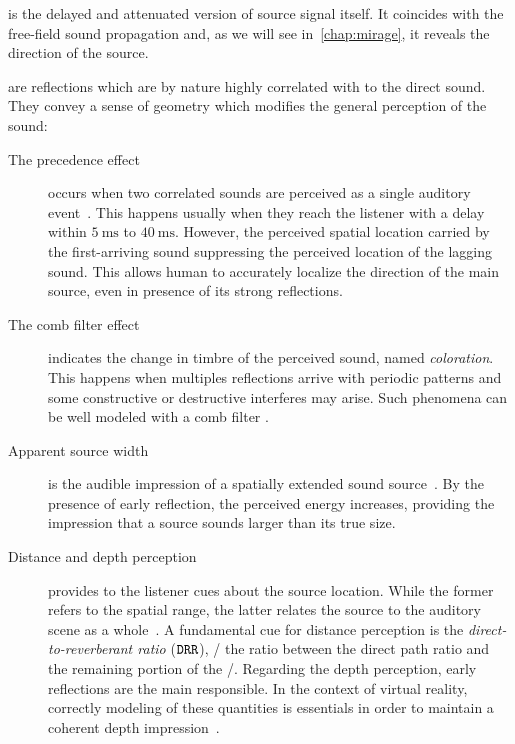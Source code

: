  is the delayed and attenuated version of source signal itself.
It coincides with the free-field sound propagation and, as we will see in~\cref{chap:mirage}, it reveals the direction of the source.

 are reflections which are by nature highly correlated with to the direct sound.
They convey a sense of geometry which modifies the general perception of the sound:
\begin{description}
    \item[The precedence effect] occurs when two correlated sounds are perceived as a single auditory event~.
    This happens usually when they reach the listener with a delay within $\SI{5}{\ms}$ to $\SI{40}{\ms}$.
    However, the perceived spatial location carried by the first-arriving sound suppressing the perceived location of the lagging sound.
    This allows human to accurately localize the direction of the main source, even in presence of its strong reflections.
    \item[The comb filter effect] indicates the change in timbre of the perceived sound, named \textit{coloration}.
    This happens when multiples reflections arrive with periodic patterns and some constructive or destructive interferes may arise.
    Such phenomena can be well modeled with a comb filter .
    \item[Apparent source width] is the audible impression of a spatially extended sound source~.
    By the presence of early reflection, the perceived energy increases, providing the impression that a source sounds larger than its true size.
    \item[Distance and depth perception] provides to the listener cues about the source location.
    While the former refers to the spatial range, the latter relates the source to the auditory scene as a whole~.
    A fundamental cue for distance perception is the \textit{direct-to-reverberant ratio} ($\mathtt{DRR}$),
    \ie/ the ratio between the direct path ratio and the remaining portion of the \RIR/.
    Regarding the depth perception, early reflections are the main responsible.
    In the context of virtual reality, correctly modeling of these quantities is essentials in order to maintain a coherent depth impression~.
\end{description}

